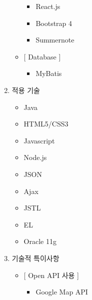 \begin{enumerate}
\begin{itemize}
\begin{itemize}
                    \item[] React.js
                    \item[] Bootstrap 4
                    \item[] Summernote
                \end{itemize}
            \item{} [ Database ]
                \begin{itemize}
                    \item[] MyBatis
                \end{itemize}
        \end{itemize}
    \item 적용 기술
        \begin{itemize}
            \item Java 
            \item HTML5/CSS3
            \item Javascript
            \item Node.js
            \item JSON
            \item Ajax
            \item JSTL
            \item EL
            \item Oracle 11g
        \end{itemize}

    \item 기술적 특이사항 
    \begin{itemize}
        \item{} [ Open API 사용 ]
            \begin{itemize}
                \item[] Google Map API
            \end{itemize}
    \end{itemize}
\end{enumerate}
\par\
\newpage



